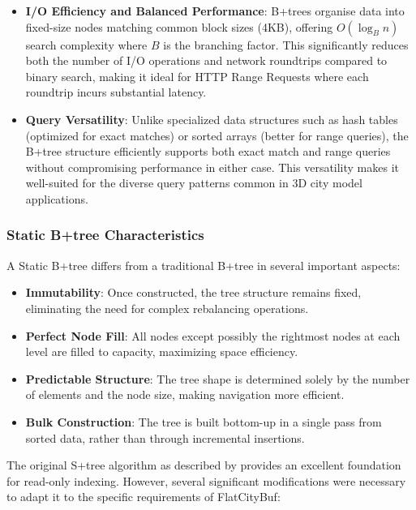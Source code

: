 \begin{itemize}
    \item \textbf{I/O Efficiency and Balanced Performance}: B+trees organise data into fixed-size nodes matching common block sizes (4KB), offering $O(\log_B n)$ search complexity where $B$ is the branching factor. This significantly reduces both the number of I/O operations and network roundtrips compared to binary search, making it ideal for HTTP Range Requests where each roundtrip incurs substantial latency.

    \item \textbf{Query Versatility}: Unlike specialized data structures such as hash tables (optimized for exact matches) or sorted arrays (better for range queries), the B+tree structure efficiently supports both exact match and range queries without compromising performance in either case. This versatility makes it well-suited for the diverse query patterns common in 3D city model applications.
\end{itemize}

\subsubsection{Static B+tree Characteristics}
\label{methodology:attribute_index:static_btree_characteristics}

A Static B+tree differs from a traditional B+tree in several important aspects:

\begin{itemize}
    \item \textbf{Immutability}: Once constructed, the tree structure remains fixed, eliminating the need for complex rebalancing operations.
    
    \item \textbf{Perfect Node Fill}: All nodes except possibly the rightmost nodes at each level are filled to capacity, maximizing space efficiency.
    
    \item \textbf{Predictable Structure}: The tree shape is determined solely by the number of elements and the node size, making navigation more efficient.
    
    \item \textbf{Bulk Construction}: The tree is built bottom-up in a single pass from sorted data, rather than through incremental insertions.
\end{itemize}

The original S+tree algorithm as described by \citet{static_b_trees} provides an excellent foundation for read-only indexing. However, several significant modifications were necessary to adapt it to the specific requirements of FlatCityBuf:


